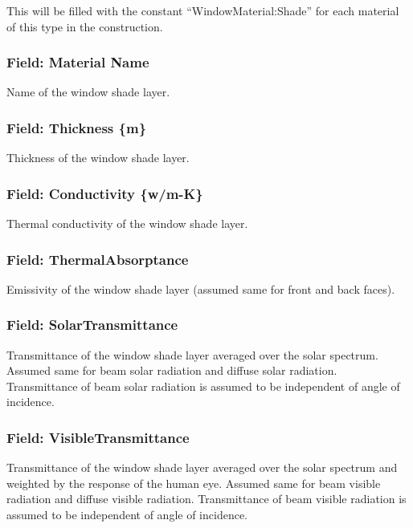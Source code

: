 This will be filled with the constant ``WindowMaterial:Shade'' for each material of this type in the construction.

\subsubsection{Field: Material Name}\label{field-material-name-4}

Name of the window shade layer.

\subsubsection{Field: Thickness \{m\}}\label{field-thickness-m-2}

Thickness of the window shade layer.

\subsubsection{Field: Conductivity \{w/m-K\}}\label{field-conductivity-wm-k-1}

Thermal conductivity of the window shade layer.

\subsubsection{Field: ThermalAbsorptance}\label{field-thermalabsorptance}

Emissivity of the window shade layer (assumed same for front and back faces).

\subsubsection{Field: SolarTransmittance}\label{field-solartransmittance-1}

Transmittance of the window shade layer averaged over the solar spectrum. Assumed same for beam solar radiation and diffuse solar radiation. Transmittance of beam solar radiation is assumed to be independent of angle of incidence.

\subsubsection{Field: VisibleTransmittance}\label{field-visibletransmittance-1}

Transmittance of the window shade layer averaged over the solar spectrum and weighted by the response of the human eye. Assumed same for beam visible radiation and diffuse visible radiation. Transmittance of beam visible radiation is assumed to be independent of angle of incidence.

